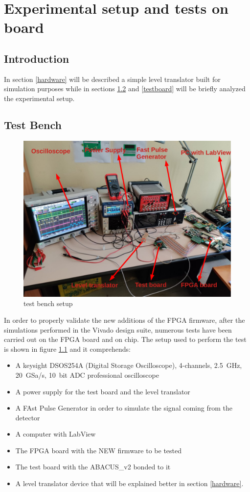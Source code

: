 \chapter{Experimental setup and tests on board}
\section{Introduction}
In section \ref{hardware} will be described a simple level translator built for simulation purposes while in sections \ref{testbench} and \ref{testboard} will be briefly analyzed the experimental setup.

\section{Test Bench}\label{testbench}
\begin{figure}[H]
	\centering
	\includegraphics[width=0.7\linewidth]{IMG/ch5/TESTBENCH}
	\caption{test bench setup}
	\label{fig:testbench}
\end{figure}
In order to properly validate the new additions of the FPGA firmware, after the simulations performed in the Vivado design suite, numerous tests have been carried out on the FPGA board and on chip.
The setup used to perform the test is shown in figure \ref{fig:testbench} and it comprehends:
\begin{itemize}
	\item A keysight DSOS254A (Digital Storage Oscilloscope), 4-channels, 2.5~GHz, 20~GSa/s, 10~bit ADC professional oscilloscope
	\item A power supply for the test board and the level translator
	\item A FAst Pulse Generator in order to simulate the signal coming from the detector
	\item A computer with LabView
	\item The FPGA board with the NEW firmware to be tested
	\item The test board with the ABACUS\_v2 bonded to it
	\item A level translator device that will be explained better in section \ref{hardware}.
\end{itemize}

